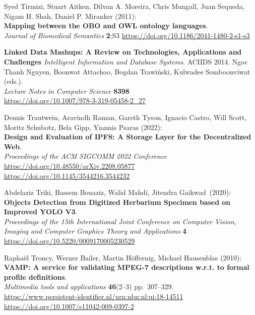 \begin{thebibliography}{9}
Syed Tirmizi, Stuart Aitken, Dilvan A. Moreira, Chris Mungall, Juan
Sequeda, Nigam H. Shah, Daniel P. Miranker (2011): \\
\textbf{Mapping between the {OBO} and {OWL} ontology languages}. \\
\emph{Journal of Biomedical Semantics} \textbf{2}:S3
\url{https://doi.org/10.1186/2041-1480-2-s1-s3}

\textbf{Linked Data Mashups: A Review on Technologies, Applications and Challenges}
\emph{Intelligent Information and Database Systems}. ACIIDS 2014. Ngoc Thanh Nguyen, Boonwat Attachoo, Bogdan Trawiński, Kulwadee Somboonviwat (eds.).\\
\emph{Lecture Notes in Computer Science} \textbf{8398}\\
\url{https://doi.org/10.1007/978-3-319-05458-2_27}

Dennis Trautwein, Aravindh Raman, Gareth Tyson, Ignacio Castro, Will Scott, Moritz Schubotz, Bela Gipp, Yiannis Psaras (2022):\\
\textbf{Design and Evaluation of IPFS: A Storage Layer for the Decentralized Web}.\\
\emph{Proceedings of the {ACM} {SIGCOMM} 2022 Conference}\\
\url{https://doi.org/10.48550/arXiv.2208.05877}\\
\url{https://doi.org/10.1145/3544216.3544232}

Abdelaziz Triki, Bassem Bouaziz, Walid Mahdi, Jitendra Gaikwad~(2020):\\
\textbf{Objects Detection from Digitized Herbarium Specimen based on Improved
YOLO V3}.\\
\emph{Proceedings of the 15th International Joint Conference on Computer Vision, Imaging and Computer Graphics Theory and Applications} 
\textbf{4}\\
\url{https://doi.org/10.5220/0009170005230529}

Raphaël Troncy, Werner Bailer, Martin Höffernig, Michael Hausenblas (2010):\\
\textbf{VAMP: A service for validating MPEG-7 descriptions w.r.t. to
formal profile definitions}.\\
\emph{Multimedia tools and applications} \textbf{46}(2--3)
pp.~307--329.\\
\url{https://www.persistent-identifier.nl/urn:nbn:nl:ui:18-14511}\\
\url{https://doi.org/10.1007/s11042-009-0397-2}


\end{thebibliography}
